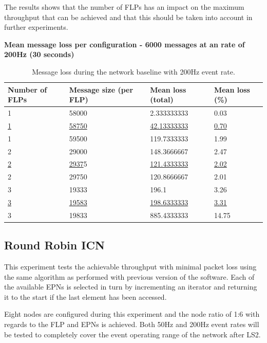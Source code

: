 \documentclass[]{article}
\begin{document}
The results shows that the number of FLPs has an impact on the maximum throughput that can be achieved and that this should be taken into account in further experiments. 

\begin{table}[H]
	\textbf{Mean message loss per configuration - 6000 messages at an rate of 200Hz (30 seconds)}
	\begin{center}
		\begin{tabularx}{\textwidth}{ | X | X | X | X | }
			\hline
			\textbf{Number of FLPs} & \textbf{Message size (per FLP)} & \textbf{Mean loss (total)} & \textbf{Mean loss (\%)} \\ \hline
			
			1 & 58000 & 2.333333333 & 0.03 \\ \hline
			\underline{1} & \underline{58750} & \underline{42.13333333} & \underline{0.70} \\ \hline
			1 & 59500 & 119.7333333 & 1.99 \\ \hline
			
			2 & 29000 & 148.3666667 & 2.47 \\ \hline
			\underline{2} & \underline{2937}5 & \underline{121.4333333} & \underline{2.02} \\ \hline
			2 & 29750 & 120.8666667 & 2.01 \\ \hline
			
			3 & 19333 & 196.1 & 3.26 \\ \hline
			\underline{3} & \underline{19583} & \underline{198.6333333} & \underline{3.31} \\ \hline
			3 & 19833 & 885.4333333 & 14.75 \\ \hline
		\end{tabularx}
		\caption{Message loss during the network baseline with 200Hz event rate.}
		\label{tab:resultsbaseline}
	\end{center}
\end{table}

\subsection{Round Robin ICN}
This experiment tests the achievable throughput with minimal packet loss using the same algorithm as performed with previous version of the software. Each of the available EPNs is selected in turn by incrementing an iterator and returning it to the start if the last element has been accessed. 

Eight nodes are configured during this experiment and the node ratio of 1:6 with regards to the FLP and EPNs is achieved. Both 50Hz and 200Hz event rates will be tested to completely cover the event operating range of the network after LS2.
\end{document}
